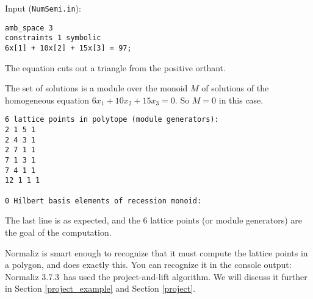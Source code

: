 \documentclass[12pt,a4paper]{scrartcl}
\theoremstyle{definition}
\def\version{3.7.3}
\begin{document}
\begin{minipage}[b]{0.5\textwidth}
Input (\verb|NumSemi.in|):
\begin{Verbatim}
amb_space 3
constraints 1 symbolic
6x[1] + 10x[2] + 15x[3] = 97;
\end{Verbatim}
\end{minipage}
\hspace{1cm}
\begin{minipage}[t]{0.4\textwidth}
\end{minipage}

\medskip
The equation cuts out a triangle from the positive orthant. 

The set of solutions is a module over the monoid $M$ of solutions of the homogeneous equation $6x_1+10x_2+15x_3=0$. So $M=0$ in this case.
\begin{Verbatim}
6 lattice points in polytope (module generators):
2 1 5 1
2 4 3 1
2 7 1 1
7 1 3 1
7 4 1 1
12 1 1 1

0 Hilbert basis elements of recession monoid:
\end{Verbatim}
The last line is as expected, and the $6$ lattice points (or module generators) are the goal of the computation.

Normaliz is smart enough to recognize that it must compute the lattice points in a polygon, and does exactly this. You can recognize it in the console output:  Normaliz \version\ has used the project-and-lift algorithm. We will discuss it further in Section \ref{project_example} and Section \ref{project}.
\end{document}
